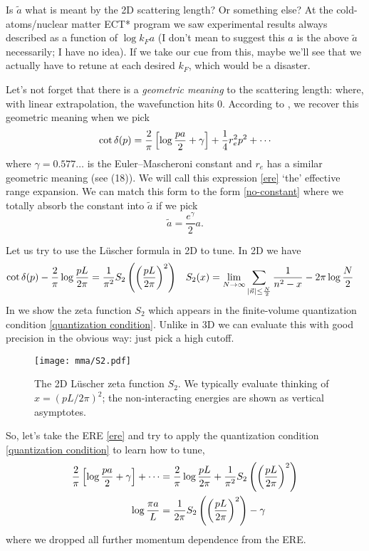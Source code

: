 Is $\tilde{a}$ what is meant by the 2D scattering length?  Or something else?
At the cold-atoms/nuclear matter ECT* program we saw experimental results always described as a function of $\log k_F a$ (I don't mean to suggest this $a$ is the above $\tilde{a}$ necessarily; I have no idea).
If we take our cue from this, maybe we'll see that we actually have to retune at each desired $k_F$, which would be a disaster.

Let's not forget that there is a \emph{geometric meaning} to the scattering length: where, with linear extrapolation, the wavefunction hits $0$.
According to , we recover this geometric meaning when we pick
\begin{align}
	\cot \delta(p) = \frac{2}{\pi}\left[\log \frac{pa}{2} + \gamma\right] + \frac{1}{4} r_e^2 p^2 + \cdots
	\label{eq:ere}
\end{align}
where $\gamma = 0.577\ldots$ is the Euler–Mascheroni constant and $r_e$ has a similar geometric meaning (see  (18)).
We will call this expression \eqref{ere} `the' effective range expansion.
We can match this form to the form \eqref{no-constant} where we totally absorb the constant into $\tilde{a}$ if we pick
\begin{equation}
	\tilde{a} = \frac{e^{\gamma}}{2} a.
\end{equation}

Let us try to use the L\"{u}scher formula in 2D to tune.
In 2D we have
\begin{align}
	\cot \delta(p) - \frac{2}{\pi} \log \frac{pL}{2\pi} &= \frac{1}{\pi^2} S_2\left(\left(\frac{pL}{2\pi}\right)^2\right)
	&	
	S_2(x) &= \lim_{N\rightarrow\infty} \sum_{\left| \vec{n} \right| \leq \frac{N}{2}} \frac{1}{n^2-x} - 2\pi \log \frac{N}{2}
	\label{eq:quantization condition}
\end{align}
In  we show the zeta function $S_2$ which appears in the finite-volume quantization condition \eqref{quantization condition}.
Unlike in 3D we can evaluate this with good precision in the obvious way: just pick a high cutoff.
\begin{figure}
	\texttt{[image: mma/S2.pdf]}
	\caption{The 2D L\"{u}scher zeta function $S_2$.  We typically evaluate thinking of $x = (pL/2\pi)^2$; the non-interacting energies are shown as vertical asymptotes.}
	\label{fig:S2}
\end{figure}

So, let's take the ERE \eqref{ere} and try to apply the quantization condition \eqref{quantization condition} to learn how to tune,
\begin{align}
	\frac{2}{\pi} \left[\log\frac{pa}{2} + \gamma \right] + \cdots
	&=
	\frac{2}{\pi} \log \frac{pL}{2\pi} + \frac{1}{\pi^2} S_2\left(\left(\frac{pL}{2\pi}\right)^2\right)
	\\
	\log \frac{\pi a}{L} &= \frac{1}{2\pi} S_2\left(\left(\frac{pL}{2\pi}\right)^2\right) - \gamma
	\label{eq:renormalization condition}
\end{align}
where we dropped all further momentum dependence from the ERE.

